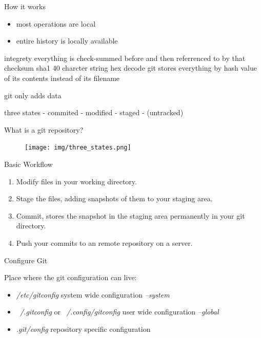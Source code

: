 \begin{frame}{How it works}

    \begin{itemize}
        \item most operations are local
        \item entire history is locally available
    \end{itemize}

    integrety
    everything is check-summed before and then referrenced to by that checksum
    sha1 40 charcter string hex decode
    git stores everything by hash value of its contents instead of its filename

    git only adds data

    three states
    - commited
    - modified
    - staged
    - (untracked)

\end{frame}

\begin{frame}{What is a git repository?}

    \begin{figure}
        \centering
        \texttt{[image: img/three\_states.png]}
    \end{figure}
\end{frame}

\begin{frame}{Basic Workflow}
    \begin{enumerate}
        \item Modify files in your working directory.
        \item Stage the files, adding snapshots of them to your staging area.
        \item Commit, stores the snapshot in the staging area permanently in
            your git directory.
        \item Push your commits to an remote repository on a server.
    \end{enumerate}
\end{frame}


\begin{frame}{Configure Git}

    Place where the git configuration can live:
    \begin{itemize}
            \item \textit{/etc/gitconfig} system wide configuration
                \textit{--system}
            \item \textit{~/.gitconfig} or \textit{~/.config/gitconfig}  user wide configuration \textit{--global}
            \item \textit{.git/config} repository specific configuration
    \end{itemize}

\end{frame}

